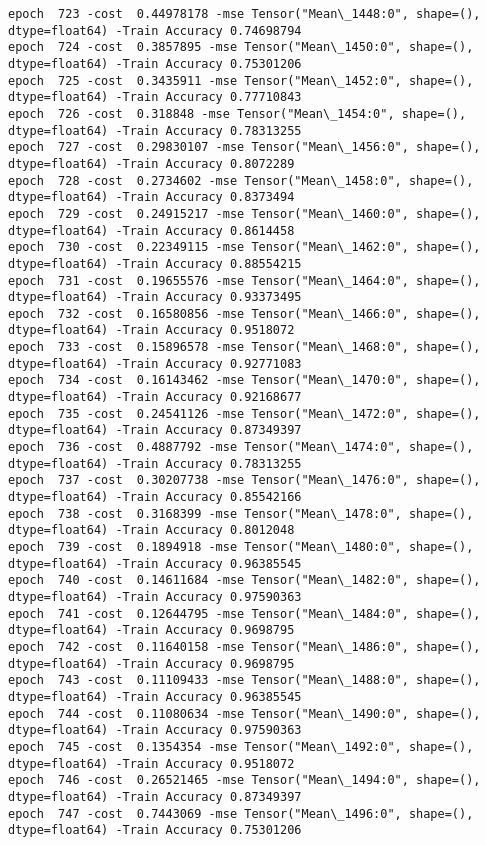 \documentclass[11pt]{article}
\begin{document}
\begin{Verbatim}[commandchars=\\\{\}]
epoch  723 -cost  0.44978178 -mse Tensor("Mean\_1448:0", shape=(), dtype=float64) -Train Accuracy 0.74698794
epoch  724 -cost  0.3857895 -mse Tensor("Mean\_1450:0", shape=(), dtype=float64) -Train Accuracy 0.75301206
epoch  725 -cost  0.3435911 -mse Tensor("Mean\_1452:0", shape=(), dtype=float64) -Train Accuracy 0.77710843
epoch  726 -cost  0.318848 -mse Tensor("Mean\_1454:0", shape=(), dtype=float64) -Train Accuracy 0.78313255
epoch  727 -cost  0.29830107 -mse Tensor("Mean\_1456:0", shape=(), dtype=float64) -Train Accuracy 0.8072289
epoch  728 -cost  0.2734602 -mse Tensor("Mean\_1458:0", shape=(), dtype=float64) -Train Accuracy 0.8373494
epoch  729 -cost  0.24915217 -mse Tensor("Mean\_1460:0", shape=(), dtype=float64) -Train Accuracy 0.8614458
epoch  730 -cost  0.22349115 -mse Tensor("Mean\_1462:0", shape=(), dtype=float64) -Train Accuracy 0.88554215
epoch  731 -cost  0.19655576 -mse Tensor("Mean\_1464:0", shape=(), dtype=float64) -Train Accuracy 0.93373495
epoch  732 -cost  0.16580856 -mse Tensor("Mean\_1466:0", shape=(), dtype=float64) -Train Accuracy 0.9518072
epoch  733 -cost  0.15896578 -mse Tensor("Mean\_1468:0", shape=(), dtype=float64) -Train Accuracy 0.92771083
epoch  734 -cost  0.16143462 -mse Tensor("Mean\_1470:0", shape=(), dtype=float64) -Train Accuracy 0.92168677
epoch  735 -cost  0.24541126 -mse Tensor("Mean\_1472:0", shape=(), dtype=float64) -Train Accuracy 0.87349397
epoch  736 -cost  0.4887792 -mse Tensor("Mean\_1474:0", shape=(), dtype=float64) -Train Accuracy 0.78313255
epoch  737 -cost  0.30207738 -mse Tensor("Mean\_1476:0", shape=(), dtype=float64) -Train Accuracy 0.85542166
epoch  738 -cost  0.3168399 -mse Tensor("Mean\_1478:0", shape=(), dtype=float64) -Train Accuracy 0.8012048
epoch  739 -cost  0.1894918 -mse Tensor("Mean\_1480:0", shape=(), dtype=float64) -Train Accuracy 0.96385545
epoch  740 -cost  0.14611684 -mse Tensor("Mean\_1482:0", shape=(), dtype=float64) -Train Accuracy 0.97590363
epoch  741 -cost  0.12644795 -mse Tensor("Mean\_1484:0", shape=(), dtype=float64) -Train Accuracy 0.9698795
epoch  742 -cost  0.11640158 -mse Tensor("Mean\_1486:0", shape=(), dtype=float64) -Train Accuracy 0.9698795
epoch  743 -cost  0.11109433 -mse Tensor("Mean\_1488:0", shape=(), dtype=float64) -Train Accuracy 0.96385545
epoch  744 -cost  0.11080634 -mse Tensor("Mean\_1490:0", shape=(), dtype=float64) -Train Accuracy 0.97590363
epoch  745 -cost  0.1354354 -mse Tensor("Mean\_1492:0", shape=(), dtype=float64) -Train Accuracy 0.9518072
epoch  746 -cost  0.26521465 -mse Tensor("Mean\_1494:0", shape=(), dtype=float64) -Train Accuracy 0.87349397
epoch  747 -cost  0.7443069 -mse Tensor("Mean\_1496:0", shape=(), dtype=float64) -Train Accuracy 0.75301206

\end{Verbatim}
\end{document}
